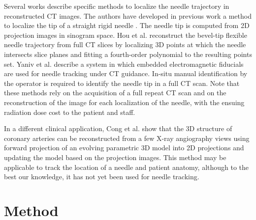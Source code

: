 Several works describe specific methods to localize the needle trajectory in reconstructed CT images. The authors have developed in previous work a method to 
localize the tip of a straight rigid needle \cite{medan2017reduced}. The needle tip  is computed from 2D projection images in sinogram space. 
Hou et al. \cite{huo2015shape} reconstruct the bevel-tip flexible needle trajectory from full CT slices by localizing 3D points at which the needle intersects slice planes and fitting a fourth-order polynomial to the resulting points set.
Yaniv et al. \cite{yaniv2010needle} describe a system in which embedded electromagnetic fiducials are used for needle tracking under CT guidance. In-situ manual identification by the operator is required to identify the needle tip in a full CT scan. Note that these methods rely on the acquisition of a full repeat CT scan and on the reconstruction of the image for each localization of the needle, with the ensuing radiation dose cost to the patient and staff.

In a different clinical application, Cong et al.  \cite{cong2015quantitative} show that the 3D structure of coronary arteries can be reconstructed from a few X-ray angiography views using forward projection of an evolving parametric 3D model into 2D projections and updating the model based on the projection images. This method may be applicable to track the location of a needle and patient anatomy, although to the best our knowledge, it has not yet been used for needle tracking. 

\section*{Method}

